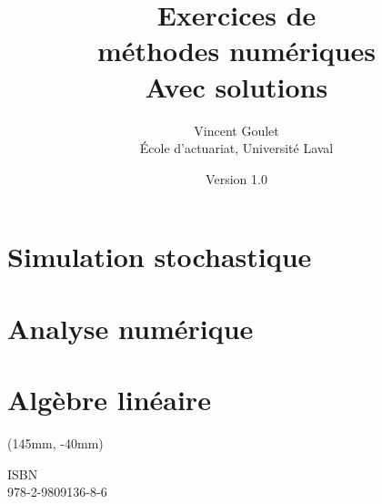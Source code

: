 \documentclass[letterpaper,10pt]{memoir}
\title{\HUGE Exercices de \\ méthodes numériques \\[0.5\baselineskip]
    \huge Avec solutions}
\author{\LARGE Vincent Goulet \\[3mm]
    \large École d'actuariat, Université Laval}
\date{\large Version 1.0}
\newcommand{\ISBN}{978-2-9809136-8-6}
\begin{document}

\frontmatter

\pagestyle{empty}


\pagestyle{companion}



\cleardoublepage
\tableofcontents*

\mainmatter


\part{Simulation stochastique}
\label{part:simulation}




\part{Analyse numérique}
\label{part:analysenumerique}




\part{Algèbre linéaire}
\label{part:algebrelineaire}





\appendix


\nocite{Monahan_01,Rubinstein_81}




\cleardoublepage
\printindex

\cleardoublepage
\cleartoverso

\pagestyle{empty}
\renewcommand{\ttdefault}{hlst}

\bandeverso
\begin{textblock*}{71mm}(145mm, -40mm)
  \large\ttfamily\raggedright
  \textblockcolor{}
  ISBN \\ \ISBN
\end{textblock*}
\end{document}
